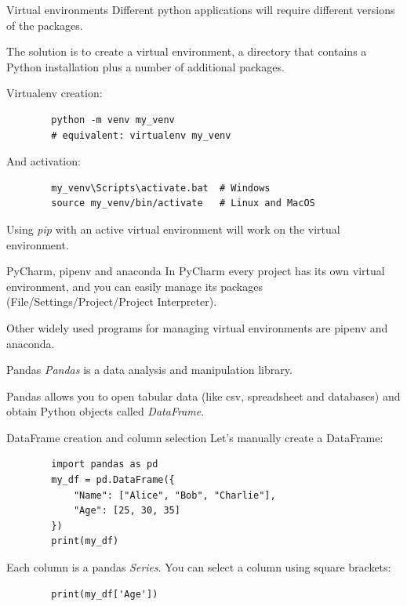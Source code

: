 \documentclass[aspectratio=169,]{beamer}
\begin{document}
\begin{frame}[fragile]{Virtual environments}
    Different python applications will require different versions of the packages.

    The solution is to create a virtual environment, a directory that contains a
    Python installation plus a number of additional packages.

    Virtualenv creation:
    \begin{verbatim}
        python -m venv my_venv
        # equivalent: virtualenv my_venv
    \end{verbatim}

    And activation:
    \begin{verbatim}
        my_venv\Scripts\activate.bat  # Windows
        source my_venv/bin/activate   # Linux and MacOS
    \end{verbatim}

    Using \emph{pip} with an active virtual environment will work on the virtual environment.
\end{frame}

\begin{frame}{PyCharm, pipenv and anaconda}
    In PyCharm every project has its own virtual environment, and you can easily manage its packages
    (File/Settings/Project/Project Interpreter).

    Other widely used programs for managing virtual environments are pipenv and anaconda.
\end{frame}

\begin{frame}{Pandas}
    \emph{Pandas} is a data analysis and manipulation library.

    Pandas allows you to open tabular data (like csv, spreadsheet and databases) and obtain Python objects called
    \emph{DataFrame}.

    \begin{figure}
        \centering
        \def\svgwidth{\textwidth}
        
    \end{figure}
\end{frame}

\begin{frame}[fragile]{DataFrame creation and column selection}
    Let's manually create a DataFrame:
    \begin{verbatim}
        import pandas as pd
        my_df = pd.DataFrame({
            "Name": ["Alice", "Bob", "Charlie"],
            "Age": [25, 30, 35]
        })
        print(my_df)
    \end{verbatim}

    \pause
    Each column is a pandas \emph{Series}.
    You can select a column using square brackets:
    \begin{verbatim}
        print(my_df['Age'])
    \end{verbatim}
\end{frame}
\end{document}
